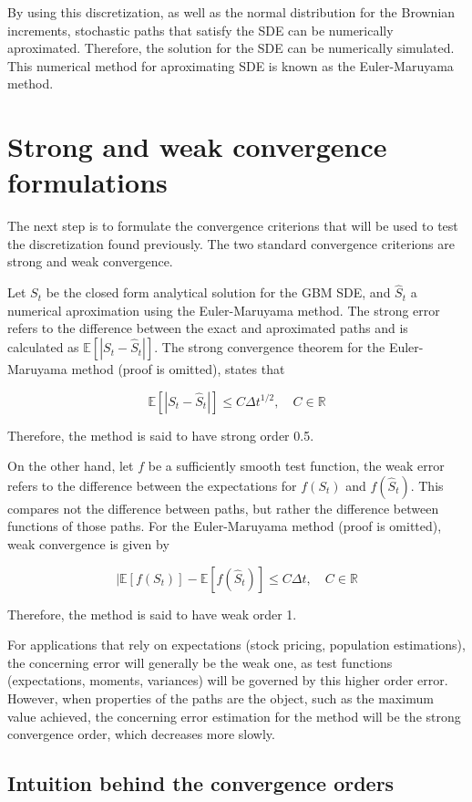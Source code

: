 \documentclass[11pt,oneside,parskip=half]{scrbook}  %
\begin{document}
By using this discretization, as well as the normal distribution for the Brownian increments, stochastic paths that satisfy the SDE can be numerically aproximated. Therefore, the solution for the SDE can be numerically simulated. This numerical method for aproximating SDE is known as the Euler-Maruyama method.

\chapter{Strong and weak convergence formulations}

The next step is to formulate the convergence criterions that will be used to test the discretization found previously. The two standard convergence criterions are strong and weak convergence.

Let $S_t$ be the closed form analytical solution for the GBM SDE, and $\hat S_t$ a numerical aproximation using the Euler-Maruyama method. The strong error refers to the difference between the exact and aproximated paths and is calculated as $\mathbb E[|S_t-\hat S_t|]$. The strong convergence theorem for the Euler-Maruyama method (proof is omitted), states that

$$
\mathbb E[|S_t-\hat S_t|] \le C \Delta t^{1/2},\quad C\in\mathbb R
$$

Therefore, the method is said to have strong order 0.5.

On the other hand, let $f$ be a sufficiently smooth test function, the weak error refers to the difference between the expectations for $f(S_t)$ and $f(\hat S_t)$. This compares not the difference between paths, but rather the difference between functions of those paths. For the Euler-Maruyama method (proof is omitted), weak convergence is given by

$$
|\mathbb E[f(S_t)]-\mathbb E[f(\hat S_t)] \le C \Delta t,\quad C\in\mathbb R
$$

Therefore, the method is said to have weak order 1.

For applications that rely on expectations (stock pricing, population estimations), the concerning error will generally be the weak one, as test functions (expectations, moments, variances) will be governed by this higher order error. However, when properties of the paths are the object, such as the maximum value achieved, the concerning error estimation for the method will be the strong convergence order, which decreases more slowly.

\section{Intuition behind the convergence orders}
\end{document}
